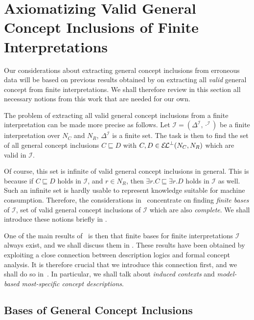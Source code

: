 \chapter{Axiomatizing Valid General Concept Inclusions of Finite Interpretations}
\label{cha:axiom-valid-el}

Our considerations about extracting general concept inclusions from erroneous data will be
based on previous results obtained by \textcite{Diss-Felix} on extracting all \emph{valid}
general concept from finite interpretations.  We shall therefore review in this section
all necessary notions from this work that are needed for our own.

The problem of extracting all valid general concept inclusions from a finite
interpretation can be made more precise as follows.  Let $\mathcal{I} =
(\Delta^{\mathcal{I}}, \cdot^{\mathcal{I}})$ be a finite interpretation over $N_C$ and
$N_R$, \ie $\Delta^{\mathcal{I}}$ is a finite set.  The task is then to find the set of
all general concept inclusions $C \sqsubseteq D$ with $C, D \in {\ensuremath{{\mathcal{E}\kern-.3ex\mathcal{L}}^\bot}}(N_C, N_R)$ which
are valid in $\mathcal{I}$.

Of course, this set is infinite of valid general concept inclusions in general.  This is
because if $C \sqsubseteq D$ holds in $\mathcal{I}$, and $r \in N_R$, then $\exists r. C
\sqsubseteq \exists r. D$ holds in $\mathcal{I}$ as well.  Such an infinite set is hardly
usable to represent knowledge suitable for machine consumption.  Therefore, the
considerations in~\cite{Diss-Felix} concentrate on finding \emph{finite bases} of
$\mathcal{I}$, \ie set of valid general concept inclusions of $\mathcal{I}$ which are also
\emph{complete}.  We shall introduce these notions briefly in .

One of the main results of~\cite{Diss-Felix} is then that finite bases for finite
interpretations $\mathcal{I}$ always exist, and we shall discuss them in
.  These results have been obtained by exploiting a close
connection between description logics and formal concept analysis.  It is therefore
crucial that we introduce this connection first, and we shall do so
in~.  In particular, we shall talk about \emph{induced contexts} and
\emph{model-based most-specific concept descriptions}.

\section{Bases of General Concept Inclusions}
\label{sec:bases-gener-conc}

